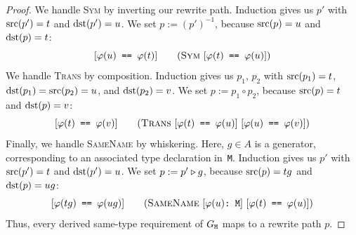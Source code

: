 \documentclass[../generics]{subfiles}
\begin{document}
\begin{proof}
\InductiveStep We handle \textsc{Sym} by inverting our rewrite path. Induction gives us $p'$ with $\operatorname{src}(p')=t$ and $\operatorname{dst}(p')=u$. We set $p:=(p')^{-1}$, because $\operatorname{src}(p)=u$ and $\operatorname{dst}(p)=t$:
\[\SameReqPhi{u}{t}\tag{\textsc{Sym} $\SameReqPhi{t}{u}$}\]
We handle \textsc{Trans} by composition. Induction gives us $p_1$, $p_2$ with $\operatorname{src}(p_1)=t$, $\operatorname{dst}(p_1)=\operatorname{src}(p_2)=u$, and $\operatorname{dst}(p_2)=v$. We set $p:=p_1\circ p_2$, because $\operatorname{src}(p)=t$ and $\operatorname{dst}(p)=v$:
\[\SameReqPhi{t}{v}\tag{\textsc{Trans} $\SameReqPhi{t}{u}$ $\SameReqPhi{u}{v}$}\]
Finally, we handle \textsc{SameName} by whiskering. Here, $g\in A$ is a generator, corresponding to an associated type declaration in~\texttt{M}. Induction gives us $p'$ with $\operatorname{src}(p')=t$ and $\operatorname{dst}(p')=u$. We set $p:=p'\triangleright g$, because $\operatorname{src}(p)=tg$ and $\operatorname{dst}(p)=ug$:
\[\SameReqPhi{tg}{ug}\tag{\textsc{SameName} $\ConfReqPhi{u}$ $\SameReqPhi{t}{u}$}\]
Thus, every derived same-type requirement of $G_\texttt{M}$ maps to a rewrite path $p$.
\end{proof}
\end{document}
